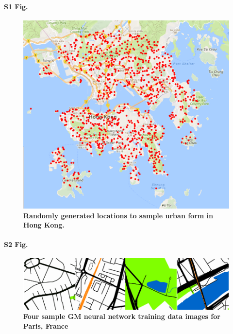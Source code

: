 \documentclass[10pt,letterpaper]{article}
\begin{document}
\paragraph*{S1 Fig.}
\begin{figure}[!htbp] 
\centering    
\includegraphics[scale=0.5]{Images/PlosOne/Fig1.png} 
\caption{\bf Randomly generated locations to sample urban form in Hong Kong.} 
\label{fig:hongkong}  
\end{figure}


\paragraph*{S2 Fig.}
\begin{figure}[!htbp]
    \centering    
\includegraphics[scale=1]{Images/PlosOne/Fig2.png}  
\caption{\bf Four sample GM neural network training data images for Paris, France \cite{GoogleStatic2017}}    
 \label{fig:maps}  
\end{figure} 
\end{document}

